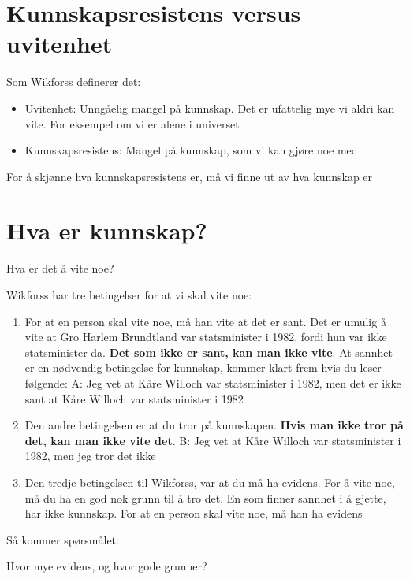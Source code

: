 \documentclass[11pt]{article}
\begin{document}
\section{Kunnskapsresistens versus uvitenhet}


Som Wikforss definerer det:
\begin{itemize}
    \item Uvitenhet: Unngåelig mangel på kunnskap. Det er ufattelig mye vi aldri kan vite. For eksempel om vi er alene i universet
    \item Kunnskapsresistens: Mangel på kunnskap, som vi kan gjøre noe med
\end{itemize}


For å skjønne hva kunnskapsresistens er, må vi finne ut av hva kunnskap er


\section{Hva er kunnskap?}


Hva er det å vite noe?

Wikforss har tre betingelser for at vi skal vite noe:

\begin{enumerate}
    \item For at en person skal vite noe, må han vite at det er sant. Det er umulig å vite at Gro Harlem Brundtland var statsminister i 1982, fordi hun var ikke statsminister da. \textbf{Det som ikke er sant, kan man ikke vite}. At sannhet er en nødvendig betingelse for kunnskap, kommer klart frem hvis du leser følgende: \vspace{1em}
    A: Jeg vet at Kåre Willoch var statsminister i 1982, men det er ikke sant at Kåre Willoch var statsminister i 1982
    \item Den andre betingelsen er at du tror på kunnskapen. \textbf{Hvis man ikke tror på det, kan man ikke vite det}. 
    \vspace{1em}
    B: Jeg vet at Kåre Willoch var statsminister i 1982, men jeg tror det ikke

    \item Den tredje betingelsen til Wikforss, var at du må ha evidens. For å vite noe, må du ha en god nok grunn til å tro det. En som finner sannhet i å gjette, har ikke kunnskap. For at en person skal vite noe, må han ha evidens 
\end{enumerate}

Så kommer spørsmålet:

\vspace{1em}
Hvor mye evidens, og hvor gode grunner?
\end{document}
